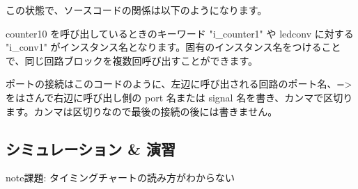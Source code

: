 \documentclass[letterpaper,10pt,dvipdfmx]{sphinxmanual}
\begin{document}
\begin{sphinxVerbatim}[commandchars=\\\{\}]
    
      
        
          
         
         
        
          

    
      
           
        
        
        
        
        
        
        

 
\end{sphinxVerbatim}

この状態で、ソースコードの関係は以下のようになります。

\begin{figure}[htbp]
\centering

\noindent{}
\end{figure}

counter10 を呼び出しているときのキーワード "i\_counter1" や ledconv に対する "i\_conv1" がインスタンス名となります。固有のインスタンス名をつけることで、同じ回路ブロックを複数回呼び出すことができます。

ポートの接続はこのコードのように、左辺に呼び出される回路のポート名、=\textgreater{} をはさんで右辺に呼び出し側の port 名または signal 名を書き、カンマで区切ります。カンマは区切りなので最後の接続の後には書きません。


\subsection{シミュレーション \& 演習}
\label{\detokenize{05_try:id26}}
\begin{sphinxadmonition}{note}{\label{\detokenize{05_try:id27}}課題:}
タイミングチャートの読み方がわからない
\end{sphinxadmonition}
\end{document}
